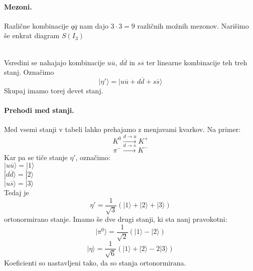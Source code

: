 \documentclass[a4paper]{article}
\begin{document}
\paragraph{Mezoni.} Različne kombinacije \(q\overline{q}\) nam dajo \(3\cdot3=9\) različnih možnih mezonov. Narišimo še enkrat diagram \(S(I_3)\) \\[1mm]
\begin{figure}[h!]
    \centering
\end{figure} \\
Vsredini se nahajajo kombinacije \(u\overline{u}\), \(d\overline{d}\) in \(s\overline{s}\) ter linearne kombinacije teh treh stanj.
Označimo \[|\eta'\rangle = |u\overline{u} + d\overline{d} + s\overline{s}\rangle\]
Skupaj imamo torej devet stanj.
\paragraph{Prehodi med stanji.} Med vsemi stanji v tabeli lahko prehajamo z menjavami kvarkov. Na primer:
\[K^0 \xrightarrow{d \to u} K^+\]
\[\pi^- \xrightarrow{d \to s} K^-\]
Kar pa se tiče stanje \(\eta'\), označimo: \\
\(|u\overline{u}\rangle = |1\rangle\) \\
\(|d\overline{d}\rangle = |2\rangle\) \\
\(|u\overline{s}\rangle = |3\rangle\) \\
Tedaj je \[\eta' = \frac{1}{\sqrt{3}}\left(|1\rangle + |2\rangle + |3\rangle\right)\]
ortonormirano stanje. Imamo še dve drugi stanji, ki sta nanj pravokotni:
\[|\pi^0\rangle = \frac{1}{\sqrt{2}}\left(|1\rangle - |2\rangle\right)\]
\[|\eta\rangle = \frac{1}{\sqrt{6}}\left(|1\rangle + |2\rangle - 2|3\rangle\right)\]
Koeficienti so nastavljeni tako, da so stanja ortonormirana.
\end{document}
